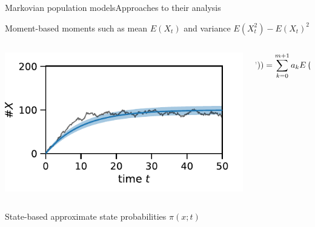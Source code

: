 \documentclass[9pt]{beamer}
\newcommand{\expSym}{{E}}
\newcommand{\E}[1]{\ensuremath{\expSym\left(#1\right)}}
\begin{document}
\begin{frame}{Markovian population models}{Approaches to their analysis}
          \begin{block}{Moment-based}
              moments such as mean $\E{X_t}$ and variance $\E{X_t^2}-\E{X_t}^2$
              \vspace{1em}
              \begin{columns}
                  \begin{column}{.4\textwidth}
                      \centering
    \includegraphics[width=\textwidth]{../gfx/momsandsims.pdf}
                  \end{column}
                  \begin{column}{.45\textwidth}
                      \vspace{-2em}
                      \[
                      \hspace{-4em}
            \frac{d}{dt}\E{{{ X}}_t^m)} = \sum_{k=0}^{m+1} a_k \E{X^k}
        \]
                  \end{column}
              \end{columns}
          \end{block}
          \begin{block}{State-based}
              approximate state probabilities $\pi(x;t)$
              \vspace{1em}
              \begin{columns}

\end{columns}
\end{block}
\end{frame}
\end{document}
